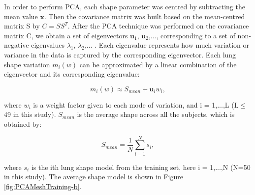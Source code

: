 {In order to perform PCA, each shape parameter was centred by subtracting the mean value $\mathbf{\bar{x}}$. Then the covariance matrix was built based on the mean-centred matrix S by $C = SS^T$. After the PCA technique was performed on the covariance matrix C, we obtain a set of eigenvectors $\mathbf{u}_1$, $\mathbf{u}_2$,..., corresponding to a set of non-negative eigenvalues $\lambda_1$, $\lambda_2$,... . Each eigenvalue represents how much variation or variance in the data is captured by the corresponding eigenvector. Each lung shape variation $m_i(w)$ can be approximated by a linear combination of the eigenvector and its corresponding eigenvalue:

\begin{equation}
 \label{eq:PCAConstruction3}
 m_i(w) \approx S_{mean} + \mathbf{u}_i w_i,
\end{equation}

\noindent where $w_i$ is a weight factor given to each mode of variation, and i = 1,...,L (L$\leq$ 49 in this study). $S_{mean}$ is the average shape across all the subjects, which is obtained by:

\begin{equation}
 \label{eq:PCAConstruction4}
 S_{mean} = \frac{1}{N}\sum_{i=1}^N s_i,
\end{equation}

 \noindent where $s_i$ is the ith lung shape model from the training set, here i = 1,...,N (N=50 in this study). The average shape model is shown in Figure \ref{fig:PCAMeshTraining-b}.

}
